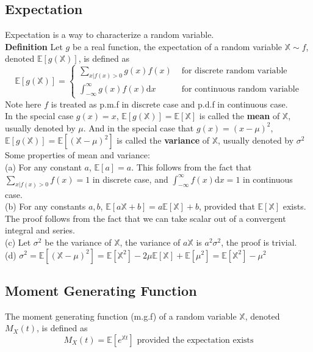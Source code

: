 \documentclass[a4paper,12pt]{article}
\begin{document}
\subsection{Expectation}
Expectation is a way to characterize a random variable.\\

\textbf{Definition} Let $g$ be a real function, the expectation of a random variable $\mathbb{X} \sim f$, denoted $\mathbb{E}[g(\mathbb{X})]$, is defined as
$$
\mathbb{E}[g(\mathbb{X})] =
  \begin{cases}
   \sum_{x|f(x)>0} g(x)f(x) & \text{ for discrete random variable}\\
   \int_{-\infty}^{\infty} g(x)f(x) \mathrm{d}x & \text{ for continuous random variable}
  \end{cases}
$$
Note here $f$ is treated as p.m.f in discrete case and p.d.f in continuous case.\\

In the special case $g(x) = x$, $\mathbb{E}[g(\mathbb{X})] = \mathbb{E}[\mathbb{X}]$ is called the \textbf{mean} of $\mathbb{X}$, usually denoted by $\mu$. And in the special case that $g(x) = (x-\mu)^2$, $\mathbb{E}[g(\mathbb{X})] = \mathbb{E}[(\mathbb{X}-\mu)^2]$ is called the \textbf{variance} of $\mathbb{X}$, usually denoted by $\sigma^2$\\

Some properties of mean and variance:\\
(a) For any constant $a$, $\mathbb{E}[a] = a$. This follows from the fact that ${\sum_{x|f(x)>0}f(x) = 1}$ in discrete case, and ${\int_{-\infty}^{\infty}f(x)\mathrm{d}x = 1}$ in continuous case.\\
(b) For any constants $a, b$, $\mathbb{E}[a\mathbb{X}+b] = a\mathbb{E}[\mathbb{X}]+b$, provided that $\mathbb{E}[\mathbb{X}]$ exists. The proof follows from the fact that we can take scalar out of a convergent integral and series.\\
(c) Let $\sigma^2$ be the variance of $\mathbb{X}$, the variance of $a\mathbb{X}$ is $a^2\sigma^2$, the proof is trivial.\\
(d) $\sigma^2 = \mathbb{E}[(\mathbb{X}-\mu)^2] = \mathbb{E}[\mathbb{X}^2]-2\mu\mathbb{E}[\mathbb{X}]+\mathbb{E}[\mu^2] = \mathbb{E}[\mathbb{X}^2] - \mu^2$


\subsection{Moment Generating Function}
The moment generating function (m.g.f) of a random variable $\mathbb{X}$, denoted $M_X(t)$, is defined as
$$M_X(t) = \mathbb{E}[e^{\mathbb{X}t}]\text{ provided the expectation exists}$$
\end{document}
